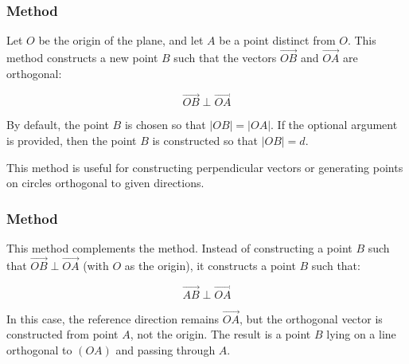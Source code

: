 \subsubsection{Method }
\label{ssub:orthogonal_method}

Let $O$ be the origin of the plane, and let $A$ be a point distinct from $O$. This method constructs a new point $B$ such that the vectors $\overrightarrow{OB}$ and $\overrightarrow{OA}$ are orthogonal:

\[
\overrightarrow{OB} \perp \overrightarrow{OA}
\]

\medskip
\noindent
By default, the point $B$ is chosen so that $|OB| = |OA|$. If the optional argument  is provided, then the point $B$ is constructed so that $|OB| = d$.

\medskip
\noindent
This method is useful for constructing perpendicular vectors or generating points on circles orthogonal to given directions.

\vspace{1em}


\begin{tkzexample}[latex=7cm]
\begin{center}
\end{center}
\end{tkzexample}

\subsubsection{Method }
\label{ssub:_point_at_method}

This method complements the  method. Instead of constructing a point $B$ such that $\overrightarrow{OB} \perp \overrightarrow{OA}$ (with $O$ as the origin), it constructs a point $B$ such that:

\[
\overrightarrow{AB} \perp \overrightarrow{OA}
\]

\noindent
In this case, the reference direction remains $\overrightarrow{OA}$, but the orthogonal vector is constructed from point $A$, not the origin. The result is a point $B$ lying on a line orthogonal to $(OA)$ and passing through $A$.

